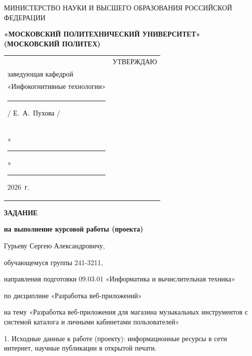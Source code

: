 \documentclass[14pt, a4paper]{extarticle}
\begin{document}
\pagestyle{empty}


\begin{center}
    {\small МИНИСТЕРСТВО НАУКИ И ВЫСШЕГО ОБРАЗОВАНИЯ РОССИЙСКОЙ ФЕДЕРАЦИИ}


    {\small \textbf{«МОСКОВСКИЙ ПОЛИТЕХНИЧЕСКИЙ УНИВЕРСИТЕТ»}} \\
    {\small \textbf{(МОСКОВСКИЙ ПОЛИТЕХ)}}
\end{center}

\begin{tabularx}{\textwidth}{@{} p{} p{} @{}}
     &
    \raggedright
    УТВЕРЖДАЮ                          \\
    заведующая кафедрой                \\
    «Инфокогнитивные технологии»       \\[0.3cm]

    \rule{3cm}{0.4pt} / Е.~А.~Пухова / \\[0.1cm]

    «\rule{0.8cm}{0.4pt}» \rule{3cm}{0.4pt} 2026~г.
\end{tabularx}


\begin{center}

    { \large \textbf{ЗАДАНИЕ}}

    \textbf{на выполнение курсовой работы (проекта)}

    Гурьеву Сергею Александровичу, %

\end{center}

обучающемуся группы 241-3211,

направления подготовки 09.03.01 «Информатика и вычислительная техника»

по дисциплине «Разработка веб-приложений»

на тему «Разработка веб-приложения для магазина музыкальных инструментов с системой каталога и личными кабинетами пользователей»

1. Исходные данные к работе (проекту): информационные ресурсы в сети
интернет, научные публикации в открытой печати.
\end{document}
